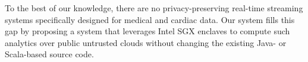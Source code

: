 To the best of our knowledge, there are no privacy-preserving real-time streaming systems specifically designed for  medical and cardiac data. 
Our system fills this gap by proposing a system that leverages Intel SGX enclaves to compute such analytics over public untrusted clouds without changing the existing Java- or Scala-based source code.


